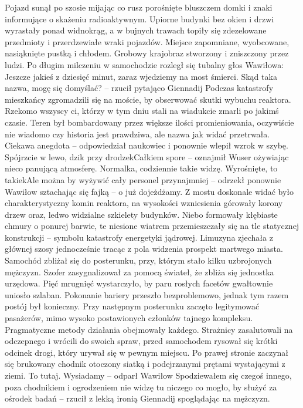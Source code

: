 \documentclass[../MAIN.tex]{subfiles}
\begin{document}
Pojazd sunął po szosie mijając co rusz porośnięte bluszczem domki i znaki informujące o skażeniu radioaktywnym. Upiorne budynki bez okien i drzwi wyrastały ponad widnokrąg, a w bujnych trawach topiły się zdezelowane przedmioty i przerdzewiałe wraki pojazdów. Miejsce zapomniane, wyobcowane, nasiąknięte pustką i chłodem. Grobowy krajobraz stworzony i zniszczony przez ludzi.
Po długim milczeniu w samochodzie rozległ się tubalny głos Wawiłowa:
% 
\sx Jeszcze jakieś z dziesięć minut, zaraz wjedziemy na most śmierci. 
\xx Skąd taka nazwa, mogę się domyślać? -- rzucił pytająco Giennadij 
\xx Podczas katastrofy mieszkańcy zgromadzili się na moście, by obserwować skutki wybuchu reaktora. Rzekomo wszyscy ci, którzy w tym dniu stali na wiadukcie zmarli po jakimś czasie. Teren był bombardowany przez większe ilości promieniowania, oczywiście nie wiadomo czy historia jest prawdziwa, ale nazwa jak widać przetrwała. 
\xx Ciekawa anegdota -- odpowiedział naukowiec i ponownie wlepił wzrok w szybę. 
\xx Spójrzcie w lewo, dzik przy drodze\3kCałkiem spore -- oznajmił Wuser ożywiając nieco panującą atmosferę. 
\xx Normalka, codziennie takie widzę. Wyrośnięte, to takie\3kAle można by wyżywić cały personel przynajmniej -- odrzekł ponownie Wawiłow sztachając się fajką -- o już dojeżdżamy. 
\qd
Z mostu doskonale widać było charakterystyczny komin reaktora, na wysokości wzniesienia górowały korony drzew oraz, ledwo widzialne szkielety budynków. Niebo formowały kłębiaste chmury o ponurej barwie, te niesione wiatrem przemieszczały się na tle statycznej konstrukcji -- symbolu katastrofy energetyki jądrowej. 
Limuzyna zjechała z głównej szosy jednocześnie tracąc z pola widzenia prospekt martwego miasta. Samochód zbliżał się do posterunku, przy, którym stało kilku uzbrojonych mężczyzn. Szofer zasygnalizował za pomocą świateł, że zbliża się jednostka urzędowa. Pięć mrugnięć wystarczyło, by paru rosłych facetów gwałtownie uniosło szlaban. Pokonanie bariery przeszło bezproblemowo, jednak tym razem postój był konieczny. Przy następnym posterunku zaczęto legitymować pasażerów, mimo wysoko postawionych członków tajnego kompleksu. Pragmatyczne metody działania obejmowały każdego. Strażnicy zasalutowali na odczepnego i wrócili do swoich spraw, przed samochodem rysował się krótki odcinek drogi, który urywał się w pewnym miejscu. Po prawej stronie zaczynał się brukowany chodnik otoczony siatką i podejrzanymi prętami wystającymi z ziemi. 
% 
\sx To tutaj. Wysiadamy -- odparł Wawiłow 
\xx Spodziewałem się czegoś innego, poza chodnikiem i ogrodzeniem nie widzę tu niczego co mogło, by służyć za ośrodek badań -- rzucił z lekką ironią Giennadij spoglądając na mężczyzn. 
\end{document}
